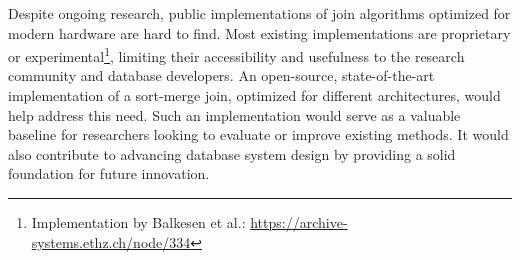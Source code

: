 Despite ongoing research, public implementations of join algorithms optimized for modern hardware
are hard to find. Most existing implementations are proprietary or 
experimental\footnote{Implementation by Balkesen et al.: \url{https://archive-systems.ethz.ch/node/334}}, limiting their
accessibility and usefulness to the research community and database developers. 
An open-source, state-of-the-art implementation of a sort-merge join, optimized for different
architectures, would help address this need. Such an implementation would serve as a valuable
baseline for researchers looking to evaluate or improve existing methods. It would also
contribute to advancing database system design by providing a solid foundation for future innovation.
